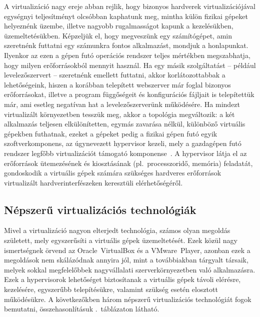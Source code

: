 A virtualizáció nagy ereje abban rejlik, hogy bizonyos hardverek virtualizációjával egységnyi teljesítményt olcsóbban kaphatunk meg, mintha külön fizikai gépeket helyeznénk üzembe, illetve nagyobb rugalmasságot kapunk a kezelésükben, üzemeltetésükben. Képzeljük el, hogy megveszünk egy számítógépet, amin szeretnénk futtatni egy számunkra fontos alkalmazást, mondjuk a honlapunkat. Ilyenkor az ezen a gépen futó operációs rendszer teljes mértékben megszabhatja, hogy milyen erőforrásokból mennyit használ. Ha egy másik szolgáltatást -- például levelezőszervert -- szeretnénk emellett futtatni, akkor korlátozottabbak a lehetőségeink, hiszen a korábban telepített webszerver már foglal bizonyos erőforrásokat, illetve a program függőségeit és konfigurációs fájljait is telepítettük már, ami esetleg negatívan hat a levelezőszerverünk működésére. Ha mindezt virtualizált környezetben tesszük meg, akkor a topológia megváltozik: a két alkalmazás teljesen elkülönítetten, egymás zavarása nélkül, különböző virtuális gépekben futhatnak, ezeket a gépeket pedig a fizikai gépen futó egyik szoftverkomponens, az úgynevezett \gls{hypervisor} kezeli, mely a gazdagépen futó rendszer legfőbb virtualizációt támogató komponense~\cite{Sles15virt}. A \gls{hypervisor} látja el az erőforrások ütemezésének és kiosztásának (pl.~processzoridő, memória) feladatát, gondoskodik a virtuális gépek számára szükséges hardveres erőforrások virtualizált hardverinterfészeken keresztüli elérhetőségéről.

\subsection{Népszerű virtualizációs technológiák}
Mivel a virtualizáció nagyon elterjedt technológia, számos olyan megoldás született, mely egyszerűsíti a virtuális gépek üzemeltetését. Ezek közül nagy ismertségnek örvend az Oracle~VirtualBox és a VMware~Player, azonban ezek a megoldások nem skálázódnak annyira jól, mint a továbbiakban tárgyalt társaik, melyek sokkal megfelelőbbek nagyvállalati szerverkörnyezetben való alkalmazásra. Ezek a \gls{hypervisor}ok lehetőséget biztosítanak a virtuális gépek távoli elérésre, kezelésére, egyszerűbb telepítésükre, valamint szükség esetén elosztott működésükre. A következőkben három népszerű virtualizációs technológiát fogok bemutatni, összehasonlításuk .~táblázaton látható.

